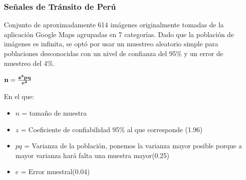 		
		\subsubsection{Señales de Tránsito de Perú} 
			Conjunto de aproximadamente 614 imágenes originalmente tomadas de la aplicación Google Maps agrupadas en 7 categorías. Dado que la población de imágenes es infinita, se optó por usar un muestreo aleatorio simple para poblaciones desconocidas con un nivel de confianza del 95\% y un error de muestreo del 4\%.
		
			\vskip 0.4cm
			\begingroup\makeatletter{}\check@mathfonts
			\begin{center}
				${\bf n} ={\bf \frac{z^2pq}{e^2}}$
			\end{center}
			\endgroup
		
			En el que:\vskip 0.1cm
			\begin{itemize}
				\item $n$ = tamaño de muestra
				\item $z$ = Coeficiente de confiabilidad 95\% al que corresponde (1.96)
				\item $pq$ = Varianza de la población, ponemos la varianza mayor posible porque a mayor varianza hará falta una muestra mayor(0.25)
				\item $e$ = Error muestral(0.04)
			\end{itemize}
